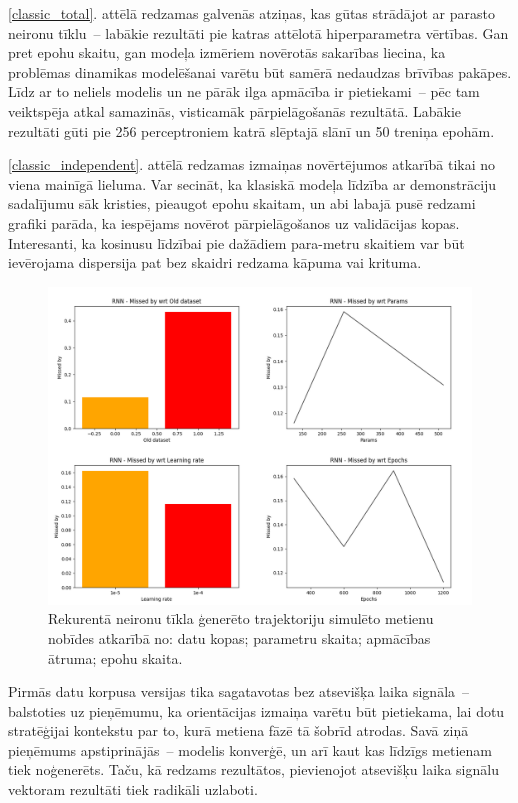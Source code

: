 \documentclass[12pt, a4paper]{article}
\numberwithin{equation}{section} %
\begin{document}
\ref{classic_total}. attēlā redzamas galvenās atziņas, kas gūtas strādājot ar parasto neironu tīklu~-- labākie rezultāti pie katras attēlotā hiperparametra vērtības. Gan pret epohu skaitu, gan modeļa izmēriem novērotās sakarības liecina, ka problēmas dinamikas modelēšanai varētu būt samērā nedaudzas brīvības pakāpes. Līdz ar to neliels modelis un ne pārāk ilga apmācība ir pietiekami~-- pēc tam veiktspēja atkal samazinās, visticamāk pārpielāgošanās rezultātā. Labākie rezultāti gūti pie 256 perceptroniem katrā slēptajā slānī un 50 treniņa epohām. 


\ref{classic_independent}. attēlā redzamas izmaiņas novērtējumos atkarībā tikai no viena mainīgā lieluma. Var secināt, ka klasiskā modeļa līdzība ar demonstrāciju sadalījumu sāk kristies, pieaugot epohu skaitam, un abi labajā pusē redzami grafiki parāda, ka iespējams novērot pārpielāgošanos uz validācijas kopas. Interesanti, ka kosinusu līdzībai pie dažādiem para-metru skaitiem var būt ievērojama dispersija pat bez skaidri redzama kāpuma vai krituma.

\begin{figure}[t!]
    \centering
    \includegraphics[width=16cm,page=1]{../img/rnn_missed.png}
    \caption{Rekurentā neironu tīkla ģenerēto trajektoriju simulēto metienu nobīdes atkarībā no: datu kopas; parametru skaita; apmācības ātruma; epohu skaita.}
    \label{rnn_total}
\end{figure}

Pirmās datu korpusa versijas tika sagatavotas bez atsevišķa laika signāla~-- balstoties uz pieņēmumu, ka orientācijas izmaiņa varētu būt pietiekama, lai dotu stratēģijai kontekstu par to, kurā metiena fāzē tā šobrīd atrodas. Savā ziņā pieņēmums apstiprinājās~-- modelis konverģē, un arī kaut kas līdzīgs metienam tiek noģenerēts. Taču, kā redzams rezultātos, pievienojot atsevišķu laika signālu vektoram rezultāti tiek radikāli uzlaboti.
\end{document}

